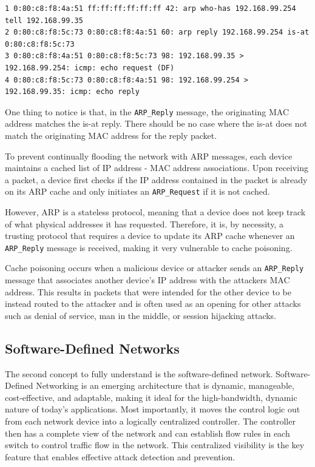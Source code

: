 \documentclass[conference]{IEEEtran}
\begin{document}
{
\tiny
\begin{verbatim}
1 0:80:c8:f8:4a:51 ff:ff:ff:ff:ff:ff 42: arp who-has 192.168.99.254 tell 192.168.99.35
2 0:80:c8:f8:5c:73 0:80:c8:f8:4a:51 60: arp reply 192.168.99.254 is-at 0:80:c8:f8:5c:73
3 0:80:c8:f8:4a:51 0:80:c8:f8:5c:73 98: 192.168.99.35 > 192.168.99.254: icmp: echo request (DF)
4 0:80:c8:f8:5c:73 0:80:c8:f8:4a:51 98: 192.168.99.254 > 192.168.99.35: icmp: echo reply
\end{verbatim}
}

One thing to notice is that, in the \texttt{ARP\_Reply} message, the originating MAC address matches the is-at reply. There should be no case where the is-at does not match the originating MAC address for the reply packet.

To prevent continually flooding the network with ARP messages, each device maintains a cached list of IP address - MAC address associations. Upon receiving a packet, a device first checks if the IP address contained in the packet is already on its ARP cache and only initiates an \texttt{ARP\_Request} if it is not cached. 

However, ARP is a stateless protocol, meaning that a device does not keep track of what physical addresses it has requested. Therefore, it is, by necessity, a trusting protocol that requires a device to update its ARP cache whenever an \texttt{ARP\_Reply} message is received, making it very vulnerable to cache poisoning.

Cache poisoning occurs when a malicious device or attacker sends an \texttt{ARP\_Reply} message that associates another device's IP address with the attackers MAC address. This results in packets that were intended for the other device to be instead routed to the attacker and is often used as an opening for other attacks such as denial of service, man in the middle, or session hijacking attacks.

\subsection{Software-Defined Networks}
The second concept to fully understand is the software-defined network. Software-Defined Networking is an emerging architecture that is dynamic, manageable, cost-effective, and adaptable, making it ideal for the high-bandwidth, dynamic nature of today's applications\cite{b11}. Most importantly, it moves the control logic out from each network device into a logically centralized controller. The controller then has a complete view of the network and can establish flow rules in each switch to control traffic flow in the network. This centralized visibility is the key feature that enables effective attack detection and prevention.
\end{document}
